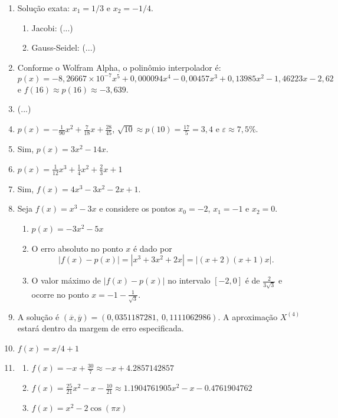 \documentclass[12pt,a4paper]{article}
\newcommand{\fixme}{{\color{red}(...)}}
\begin{document}
\begin{enumerate}
\item Solução exata: $x_1 = 1/3$ e $x_2 = -1/4$.
\begin{enumerate}
\item Jacobi: \fixme
\item Gauss-Seidel: \fixme
\end{enumerate}
\item Conforme o Wolfram Alpha, o polinômio interpolador é:
\[
p(x) = -8,\!26667 \times 10^{-7} x^5 + 0,\!000094 x^4 - 0,\!00457 x^3 + 0,\!13985 x^2 - 1,\!46223 x - 2,\!62
\]
e $f(16) \approx p(16) \approx -3,\!639$.
\item \fixme
\item $p(x) = -\frac{1}{90}x^2 + \frac{7}{18} x + \frac{28}{45}$, $\sqrt{10} \approx p(10) = \frac{17}{5} = 3,\!4$ e $\varepsilon \approx 7,\!5\%$.
\item Sim, $p(x) = 3x^2 - 14x$.
\item $p(x) = \frac{1}{12}x^3 + \frac{1}{4}x^2 + \frac{2}{3} x + 1$
\item Sim, $f(x) = 4x^3 - 3x^2 - 2x + 1$.
\item Seja $f(x) = x^3 - 3x$ e considere os pontos $x_0 = -2$, $x_1 = -1$ e $x_2 = 0$.
\begin{enumerate}
\item $p(x) = -3x^2 - 5x$
\item O erro absoluto no ponto $x$ é dado por
\[
|f(x) - p(x)| = |x^3 + 3x^2 + 2x| = |(x + 2) (x + 1) x|.
\]

\item O valor máximo de $|f(x) - p(x)|$ no intervalo $[-2, 0]$ é de $\frac{2}{3 \sqrt{3}}$ e ocorre no ponto $x = -1 - \frac{1}{\sqrt{3}}$.
\end{enumerate}
\item A solução é $(\overline{x},\overline{y}) = (0,0351187281,\ 0,1111062986)$. A aproximação $X^{(4)}$ estará dentro da margem de erro especificada.
\item $f(x) = x/4 + 1$
\item \begin{enumerate}
\item $f(x) = -x + \frac{30}{7} \approx -x + 4.2857142857$
\item $f(x) = \frac{25}{21}x^2 - x-\frac{10}{21} \approx 1.1904761905x^2 - x - 0.4761904762$
\item $f(x) = x^2 - 2\cos(\pi x)$
\end{enumerate}
\end{enumerate}
\end{document}
